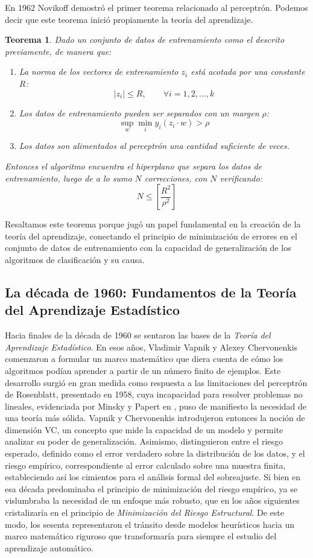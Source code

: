 \documentclass{report}
\newtheorem{thm}{Teorema}[section]
\begin{document}
En 1962 Novikoff demostró el primer teorema relacionado al perceptrón. Podemos decir que este teorema inició propiamente la teoría del aprendizaje.

\begin{thm}
Dado un conjunto de datos de entrenamiento como el descrito previamente, de manera que:
\begin{enumerate}
    \item La norma de los vectores de entrenamiento $z_i$ está acotada por una constante $R$:
    \[ |z_i| \leq R, \qquad \forall i=1,2,\dots,k \]
    \item Los datos de entrenamiento pueden ser separados con un margen $\rho$:
    \[ \sup_{w} \min_{i} y_i(z_i \cdot w) > \rho \]
    \item Los datos son alimentados al perceptrón una cantidad \textit{suficiente} de veces.
\end{enumerate}

Entonces el algoritmo encuentra el hiperplano que separa los datos de entrenamiento, luego de a lo sumo $N$ correcciones, con $N$ verificando:
\[
N \leq \left [ \frac{R^2}{\rho^2}\right ]
\]
\end{thm}

Resaltamos este teorema porque jugó un papel fundamental en la creación de la teoría del aprendizaje, conectando el principio de minimización de errores en el conjunto de datos de entrenamiento con la capacidad de generalización de los algoritmos de clasificación y su causa.


\subsection{La década de 1960: Fundamentos de la Teoría del Aprendizaje Estadístico}

Hacia finales de la década de 1960 se sentaron las bases de la \textit{Teoría del Aprendizaje Estadístico}. En esos años, Vladimir Vapnik y Alexey Chervonenkis comenzaron a formular un marco matemático que diera cuenta de cómo los algoritmos podían aprender a partir de un número finito de ejemplos. Este desarrollo surgió en gran medida como respuesta a las limitaciones del perceptrón de Rosenblatt, presentado en 1958, cuya incapacidad para resolver problemas no lineales, evidenciada por Minsky y Papert en \cite{minsky1969}, puso de manifiesto la necesidad de una teoría más sólida. Vapnik y Chervonenkis introdujeron entonces la noción de dimensión VC, un concepto que mide la capacidad de un modelo y permite analizar su poder de generalización. Asimismo, distinguieron entre el riesgo esperado, definido como el error verdadero sobre la distribución de los datos, y el riesgo empírico, correspondiente al error calculado sobre una muestra finita, estableciendo así los cimientos para el análisis formal del sobreajuste. Si bien en esa década predominaba el principio de minimización del riesgo empírico, ya se vislumbraba la necesidad de un enfoque más robusto, que en los años siguientes cristalizaría en el principio de \textit{Minimización del Riesgo Estructural}. De este modo, los sesenta representaron el tránsito desde modelos heurísticos hacia un marco matemático riguroso que transformaría para siempre el estudio del aprendizaje automático.
\end{document}
